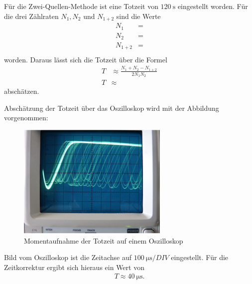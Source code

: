 Für die Zwei-Quellen-Methode ist eine Totzeit von $\SI{120}{\second} $ eingestellt worden.
Für die drei Zählraten $N_1, N_2$ und $N_{1+2} $ sind die Werte
\begin{align}
    N_1&= \text{} \label{eq:5} \\
    N_2&= \text{} \label{eq:6} \\
    N_{1+2}&= \text{} \label{eq:7} \\
\end{align}
\justifying worden.
Daraus lässt sich die Totzeit über die Formel \cite{V703}
\begin{align}
    T &\approx \frac{N_1+N_2-N_{1+2}}{2N_1 N_2} \label{eq:8}\\
    T &\approx \text{} \label{eq:9}
\end{align}
abschätzen.

\justifying Abschätzung der Totzeit über das Oszilloskop wird mit der Abbildung vorgenommen:
\begin{figure}[H]
    \centering
    \includegraphics[width=\linewidth]{images/oszi.jpg}
    \caption{Momentaufnahme der Totzeit auf einem Oszilloskop\cite{matplotlib}}
    \label{fig:8}
\end{figure}
\justifying  Bild vom Oszilloskop ist die Zeitachse auf  $\SI{100}{\micro\second}/DIV $
eingestellt.
Für die Zeitkorrektur ergibt sich hieraus ein Wert von
\begin{align}
    T \approx \SI{40}{\micro\second} \label{eq:10} .
\end{align}


